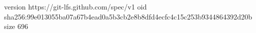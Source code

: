version https://git-lfs.github.com/spec/v1
oid sha256:99e013055ba07a67b4ead0a5b3cb2e8b8dfd4ecfc4c15c253b9344864392d20b
size 696
